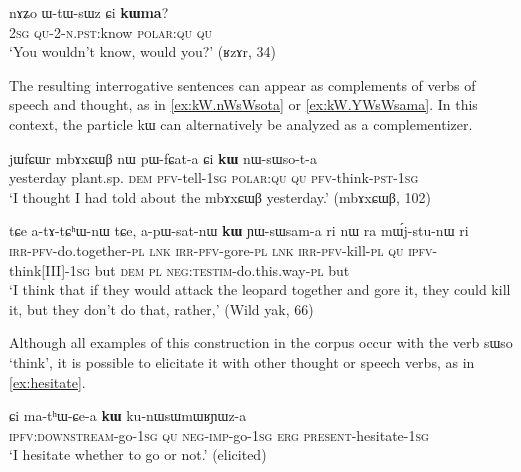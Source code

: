 \documentclass[oldfontcommands,oneside,a4paper,11pt]{article}
\newcommand{\ipa}[1]{{\phon #1}} %
\begin{document}
        \begin{exe} 
 \ex \label{ex:kWma3}
\gll 
 \ipa{nɤʑo} 	\ipa{ɯ-tɯ-sɯz} 	\ipa{ɕi} 	\ipa{\textbf{kɯma}?}  \\
 \textsc{2sg} \textsc{qu-2-n.pst}:know \textsc{polar:qu} \textsc{qu} \\
\glt `You wouldn't know, would you?' (ʁzɤr, 34)
    \end{exe}
    
 
    
    The resulting interrogative sentences can appear as complements of verbs of speech and thought, as in \ref{ex:kW.nWsWsota} or \ref{ex:kW.YWsWsama}. In this context, the particle \ipa{kɯ} can alternatively be analyzed as a complementizer.
    
    \begin{exe} 
 \ex \label{ex:kW.nWsWsota}
\gll 
    \ipa{jɯfɕɯr} 	\ipa{mbɤxɕɯβ} 	\ipa{nɯ} 	\ipa{pɯ-fɕat-a} 	\ipa{ɕi} 	\ipa{\textbf{kɯ}} 	\ipa{nɯ-sɯso-t-a} \\
    yesterday plant.sp. \textsc{dem} \textsc{pfv}-tell-\textsc{1sg} \textsc{polar:qu} \textsc{qu} \textsc{pfv}-think-\textsc{pst-1sg} \\
    \glt `I thought I had told about the   \ipa{mbɤxɕɯβ} yesterday.' (mbɤxɕɯβ, 102)
 \end{exe}  
 

    \begin{exe} 
 \ex \label{ex:kW.YWsWsama}
\gll \ipa{a-kɤ-nɯtsʰɤβ-nɯ} 	\ipa{tɕe} 	\ipa{a-tɤ-tɕʰɯ-nɯ} 	\ipa{tɕe,} 	\ipa{a-pɯ-sat-nɯ} 	\ipa{\textbf{kɯ}} 	\ipa{ɲɯ-sɯsam-a} 	\ipa{ri}  \ipa{nɯ} \ipa{ra} 	\ipa{mɯ́j-stu-nɯ} 	\ipa{ri} \\
\textsc{irr-pfv}-do.together-\textsc{pl} \textsc{lnk} \textsc{irr-pfv}-gore-\textsc{pl} \textsc{lnk } \textsc{irr-pfv}-kill-\textsc{pl} \textsc{qu} \textsc{ipfv}-think[III]-\textsc{1sg} but \textsc{dem} \textsc{pl} \textsc{neg:testim}-do.this.way-\textsc{pl}  but \\
\glt `I think that if they would attack the leopard together and gore it, they could kill it, but they don't do that, rather,' (Wild yak, 66)
 \end{exe} 
 
 
Although all examples of this construction in the corpus occur with the verb \ipa{sɯso} `think', it is possible to elicitate it with other thought or speech verbs, as in \ref{ex:hesitate}.


 \begin{exe} 
 \ex \label{ex:hesitate}
\gll \ipa{cʰɯ-ɕe-a}   	\ipa{ɕi}   	\ipa{ma-tʰɯ-ɕe-a}   	\ipa{\textbf{kɯ}}   	\ipa{ku-nɯsɯmɯʁɲɯz-a}          \\
\textsc{ipfv:downstream}-go-\textsc{1sg} \textsc{qu} \textsc{neg}-\textsc{imp}-go-\textsc{1sg} \textsc{erg} \textsc{present}-hesitate-\textsc{1sg}   \\
 \glt  `I hesitate whether to go or not.' (elicited)
\end{exe}  
\end{document}
